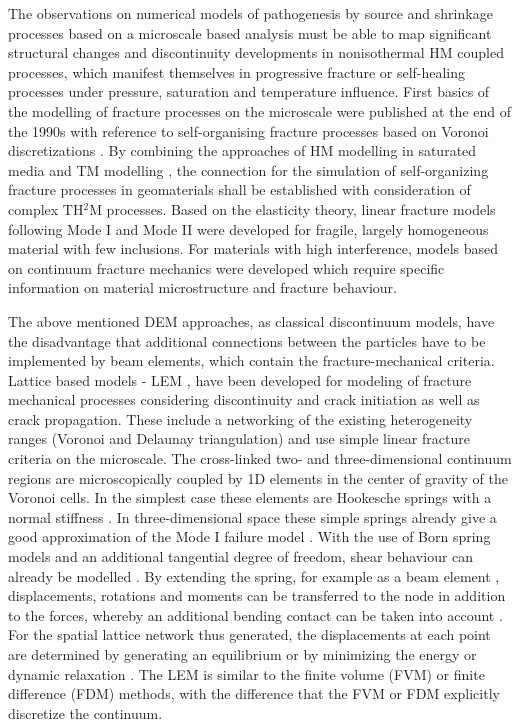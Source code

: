 The observations on numerical models of pathogenesis by source and shrinkage processes based on a microscale based analysis must be able to map significant structural changes and discontinuity developments in nonisothermal HM coupled processes, which manifest themselves in progressive fracture or self-healing processes under pressure, saturation and temperature influence. First basics of the modelling of fracture processes on the microscale were published at the end of the 1990s with reference to self-organising fracture processes based on Voronoi discretizations \cite{BolanderJr.1998569}. By combining the approaches of HM modelling in saturated media \cite{Asahina201413} and TM modelling \cite{Rizvi2016367}, the connection for the simulation of self-organizing fracture processes in geomaterials shall be established with consideration of complex TH$^2$M processes. Based on the elasticity theory, linear fracture models following Mode I and Mode II were developed for fragile, largely homogeneous material with few inclusions. For materials with high interference, models based on continuum fracture mechanics \cite{Talreja1991165} were developed which require specific information on material microstructure and fracture behaviour.

The above mentioned DEM approaches, as classical discontinuum models, have the disadvantage that additional connections between the particles have to be implemented by beam elements, which contain the fracture-mechanical criteria. Lattice based models - LEM \cite{Chessa200310},\cite{Chung199615094} have been developed for modeling of fracture mechanical processes considering discontinuity and crack initiation as well as crack propagation. These include a networking of the existing heterogeneity ranges (Voronoi and Delaunay triangulation) and use simple linear fracture criteria on the microscale. The cross-linked two- and three-dimensional continuum regions are microscopically coupled by 1D elements in the center of gravity of the Voronoi cells. In the simplest case these elements are Hookesche springs with a normal stiffness \cite{Curtin1990535}. In three-dimensional space these simple springs already give a good approximation of the Mode I failure model \cite{Wong2015417}. With the use of Born spring models and an additional tangential degree of freedom, shear behaviour can already be modelled \cite{Jagota19933123}. By extending the spring, for example as a beam element \cite{Schlangen1992435}, displacements, rotations and moments can be transferred to the node in addition to the forces, whereby an additional bending contact can be taken into account \cite{Sahimi1993713}. For the spatial lattice network thus generated, the displacements at each point are determined by generating an equilibrium or by minimizing the energy \cite{Meakin1991226} or dynamic relaxation \cite{Cundall197947}. The LEM is similar to the finite volume (FVM) or finite difference (FDM) methods, with the difference that the FVM or FDM explicitly discretize the continuum.


